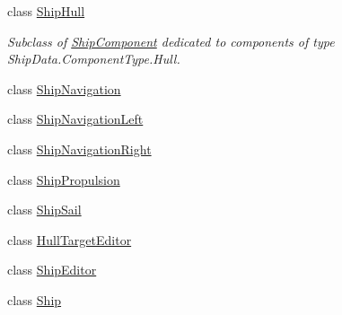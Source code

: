 \begin{DoxyCompactItemize}
class \hyperlink{class_skyrates_1_1_client_1_1_ship_1_1_ship_hull}{Ship\-Hull}
\begin{DoxyCompactList}\small\item\em Subclass of \hyperlink{class_skyrates_1_1_client_1_1_ship_1_1_ship_component}{Ship\-Component} dedicated to components of type Ship\-Data.\-Component\-Type.\-Hull. \end{DoxyCompactList}\item 
class \hyperlink{class_skyrates_1_1_client_1_1_ship_1_1_ship_navigation}{Ship\-Navigation}
\item 
class \hyperlink{class_skyrates_1_1_client_1_1_ship_1_1_ship_navigation_left}{Ship\-Navigation\-Left}
\item 
class \hyperlink{class_skyrates_1_1_client_1_1_ship_1_1_ship_navigation_right}{Ship\-Navigation\-Right}
\item 
class \hyperlink{class_skyrates_1_1_client_1_1_ship_1_1_ship_propulsion}{Ship\-Propulsion}
\item 
class \hyperlink{class_skyrates_1_1_client_1_1_ship_1_1_ship_sail}{Ship\-Sail}
\item 
class \hyperlink{class_skyrates_1_1_client_1_1_ship_1_1_hull_target_editor}{Hull\-Target\-Editor}
\item 
class \hyperlink{class_skyrates_1_1_client_1_1_ship_1_1_ship_editor}{Ship\-Editor}
\item 
class \hyperlink{class_skyrates_1_1_client_1_1_ship_1_1_ship}{Ship}
\end{DoxyCompactItemize}
